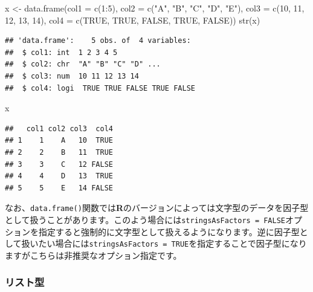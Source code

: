 \documentclass[
  12pt,
]{book}
\newenvironment{Shaded}{\begin{snugshade}}{\end{snugshade}}
\newcommand{\AttributeTok}[1]{\textcolor[rgb]{0.77,0.63,0.00}{#1}}
\newcommand{\ConstantTok}[1]{\textcolor[rgb]{0.00,0.00,0.00}{#1}}
\newcommand{\DecValTok}[1]{\textcolor[rgb]{0.00,0.00,0.81}{#1}}
\newcommand{\FunctionTok}[1]{\textcolor[rgb]{0.00,0.00,0.00}{#1}}
\newcommand{\NormalTok}[1]{#1}
\newcommand{\OtherTok}[1]{\textcolor[rgb]{0.56,0.35,0.01}{#1}}
\newcommand{\SpecialCharTok}[1]{\textcolor[rgb]{0.00,0.00,0.00}{#1}}
\newcommand{\StringTok}[1]{\textcolor[rgb]{0.31,0.60,0.02}{#1}}
\begin{document}
\begin{Shaded}
\begin{Highlighting}[]
\NormalTok{x }\OtherTok{\textless{}{-}} \FunctionTok{data.frame}\NormalTok{(}\AttributeTok{col1 =} \FunctionTok{c}\NormalTok{(}\DecValTok{1}\SpecialCharTok{:}\DecValTok{5}\NormalTok{),}
                \AttributeTok{col2 =} \FunctionTok{c}\NormalTok{(}\StringTok{"A"}\NormalTok{, }\StringTok{"B"}\NormalTok{, }\StringTok{"C"}\NormalTok{, }\StringTok{"D"}\NormalTok{, }\StringTok{"E"}\NormalTok{),}
                \AttributeTok{col3 =} \FunctionTok{c}\NormalTok{(}\DecValTok{10}\NormalTok{, }\DecValTok{11}\NormalTok{, }\DecValTok{12}\NormalTok{, }\DecValTok{13}\NormalTok{, }\DecValTok{14}\NormalTok{),}
                \AttributeTok{col4 =} \FunctionTok{c}\NormalTok{(}\ConstantTok{TRUE}\NormalTok{, }\ConstantTok{TRUE}\NormalTok{, }\ConstantTok{FALSE}\NormalTok{, }\ConstantTok{TRUE}\NormalTok{, }\ConstantTok{FALSE}\NormalTok{))}
\FunctionTok{str}\NormalTok{(x)}
\end{Highlighting}
\end{Shaded}

\begin{verbatim}
## 'data.frame':    5 obs. of  4 variables:
##  $ col1: int  1 2 3 4 5
##  $ col2: chr  "A" "B" "C" "D" ...
##  $ col3: num  10 11 12 13 14
##  $ col4: logi  TRUE TRUE FALSE TRUE FALSE
\end{verbatim}

\begin{Shaded}
\begin{Highlighting}[]
\NormalTok{x}
\end{Highlighting}
\end{Shaded}

\begin{verbatim}
##   col1 col2 col3  col4
## 1    1    A   10  TRUE
## 2    2    B   11  TRUE
## 3    3    C   12 FALSE
## 4    4    D   13  TRUE
## 5    5    E   14 FALSE
\end{verbatim}

なお、\texttt{data.frame()}関数では\textbf{R}のバージョンによっては文字型のデータを因子型として扱うことがあります。このよう場合には\texttt{stringsAsFactors\ =\ FALSE}オプションを指定すると強制的に文字型として扱えるようになります。逆に因子型として扱いたい場合には\texttt{stringsAsFactors\ =\ TRUE}を指定することで因子型になりますがこちらは非推奨なオプション指定です。

\hypertarget{ux30eaux30b9ux30c8ux578b}{%
\subsubsection{リスト型}\label{ux30eaux30b9ux30c8ux578b}}
\end{document}
